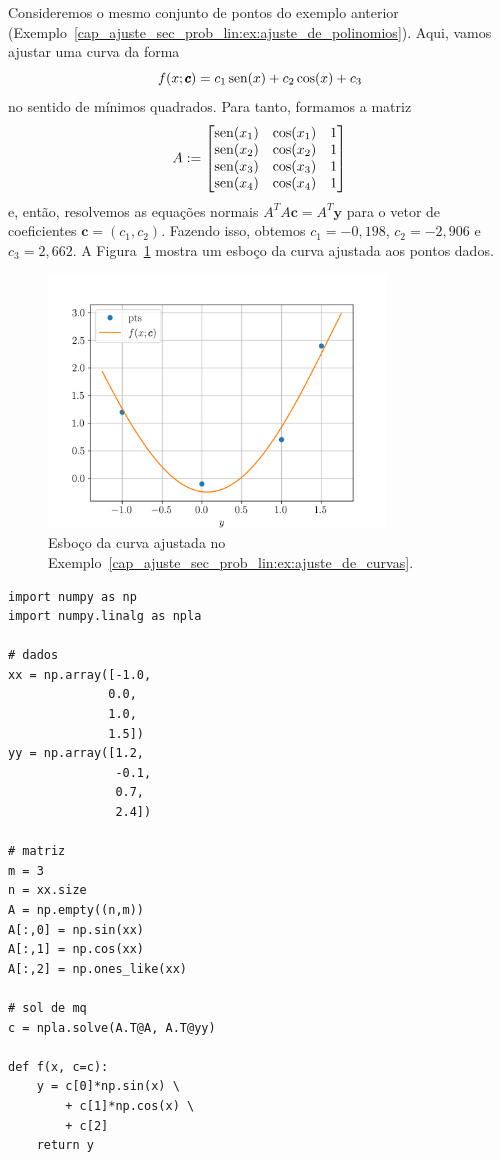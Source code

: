 \begin{ex}\label{cap_ajuste_sec_prob_lin:ex:ajuste_de_curvas}
  Consideremos o mesmo conjunto de pontos do exemplo anterior (Exemplo~\ref{cap_ajuste_sec_prob_lin:ex:ajuste_de_polinomios}). Aqui, vamos ajustar uma curva da forma
  \begin{equation}
    f(x; \pmb{c}) = c_1\operatorname{sen}(x) + c_2\cos(x) + c_3
  \end{equation}
no sentido de mínimos quadrados. Para tanto, formamos a matriz
\begin{equation}
  A :=
  \begin{bmatrix}
    \operatorname{sen}(x_1) & \cos(x_1) & 1 \\
    \operatorname{sen}(x_2) & \cos(x_2) & 1 \\
    \operatorname{sen}(x_3) & \cos(x_3) & 1 \\
    \operatorname{sen}(x_4) & \cos(x_4) & 1
  \end{bmatrix}
\end{equation}
  e, então, resolvemos as equações normais $A^TA\pmb{c} = A^T\pmb{y}$ para o vetor de coeficientes $\pmb{c} = (c_1, c_2)$. Fazendo isso, obtemos $c_1=-0,198$, $c_2=-2,906$ e $c_3=2,662$. A Figura~\ref{cap_ajuste_sec_prob_lin:fig:ex_ajuste_de_curvas} mostra um esboço da curva ajustada aos pontos dados.

  \begin{figure}[h]
    \centering
    \includegraphics[width=0.8\textwidth]{cap_ajuste/dados/fig_mqCurva/fig}
    \caption{Esboço da curva ajustada no Exemplo~\ref{cap_ajuste_sec_prob_lin:ex:ajuste_de_curvas}.}
    \label{cap_ajuste_sec_prob_lin:fig:ex_ajuste_de_curvas}
  \end{figure}

\begin{lstlisting}[caption=mqCurva.py]
import numpy as np
import numpy.linalg as npla

# dados
xx = np.array([-1.0,
              0.0,
              1.0,
              1.5])
yy = np.array([1.2,
               -0.1,
               0.7,
               2.4])

# matriz
m = 3
n = xx.size
A = np.empty((n,m))
A[:,0] = np.sin(xx)
A[:,1] = np.cos(xx)
A[:,2] = np.ones_like(xx)

# sol de mq
c = npla.solve(A.T@A, A.T@yy)

def f(x, c=c):
    y = c[0]*np.sin(x) \
        + c[1]*np.cos(x) \
        + c[2]
    return y
\end{lstlisting}
\end{ex}


